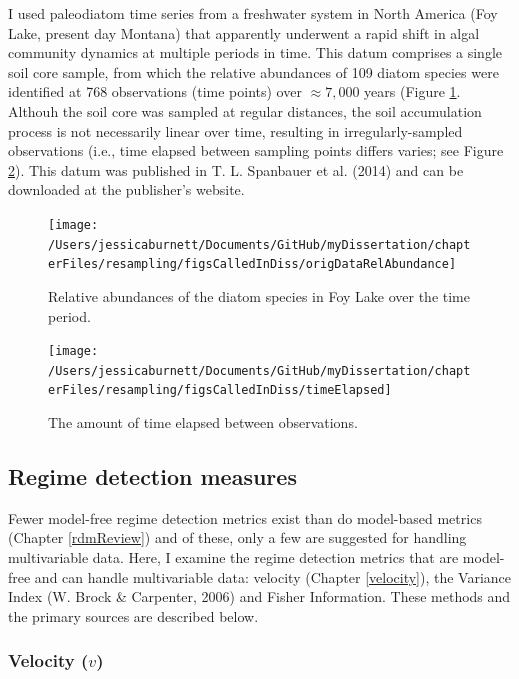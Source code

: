 \documentclass[12pt,twoside,openany]{reedthesis}
\begin{document}
I used paleodiatom time series from a freshwater system in North America
(Foy Lake, present day Montana) that apparently underwent a rapid shift
in algal community dynamics at multiple periods in time. This datum
comprises a single soil core sample, from which the relative abundances
of 109 diatom species were identified at 768 observations (time points)
over \(\approx7,000\) years (Figure \ref{fig:origDat}. Althouh the soil
core was sampled at regular distances, the soil accumulation process is
not necessarily linear over time, resulting in irregularly-sampled
observations (i.e., time elapsed between sampling points differs varies;
see Figure \ref{fig:timeElapsed}). This datum was published in T. L.
Spanbauer et al. (2014) and can be downloaded at the publisher's
website.
\begin{figure}

{\centering \texttt{[image: /Users/jessicaburnett/Documents/GitHub/myDissertation/chapterFiles/resampling/figsCalledInDiss/origDataRelAbundance]} 

}

\caption{Relative abundances of the diatom species in Foy Lake over the time period.}\label{fig:origDat}
\end{figure}
\begin{figure}

{\centering \texttt{[image: /Users/jessicaburnett/Documents/GitHub/myDissertation/chapterFiles/resampling/figsCalledInDiss/timeElapsed]} 

}

\caption{The amount of time elapsed between observations.}\label{fig:timeElapsed}
\end{figure}
\subsection{Regime detection measures}\label{regime-detection-measures}

Fewer model-free regime detection metrics exist than do model-based
metrics (Chapter \ref{rdmReview}) and of these, only a few are suggested
for handling multivariable data. Here, I examine the regime detection
metrics that are model-free and can handle multivariable data: velocity
(Chapter \ref{velocity}), the Variance Index (W. Brock \& Carpenter,
2006) and Fisher Information. These methods and the primary sources are
described below.

\subsubsection{\texorpdfstring{Velocity
(\(v\))}{Velocity (v)}}\label{velocity-v}
\end{document}
